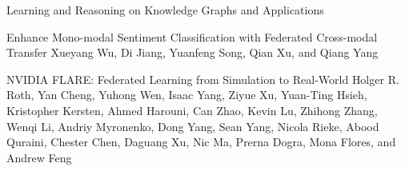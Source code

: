 \documentclass[11pt]{article}
\begin{document}
\begin{bulletin}
\begin{articlesection}{Learning and Reasoning on Knowledge Graphs and Applications}
\begin{article}
{Enhance Mono-modal Sentiment Classification with Federated Cross-modal Transfer}
{Xueyang Wu, Di Jiang, Yuanfeng Song, Qian Xu, and Qiang Yang}

\end{article}



\begin{article}
{NVIDIA FLARE: Federated Learning from Simulation to Real-World}
{Holger R. Roth,
Yan Cheng,
Yuhong Wen,
Isaac Yang,
Ziyue Xu,
Yuan-Ting Hsieh,
Kristopher Kersten,
Ahmed Harouni,
Can Zhao,
Kevin Lu,
Zhihong Zhang,
Wenqi Li,
Andriy Myronenko,
Dong Yang,
Sean Yang,
Nicola Rieke,
Abood Quraini,
Chester Chen,
Daguang Xu,
Nic Ma,
Prerna Dogra,
Mona Flores, and
Andrew Feng}

\end{article}





\end{articlesection}




%
%



\begin{callsection}


\end{callsection}
\end{bulletin}
\end{document}
